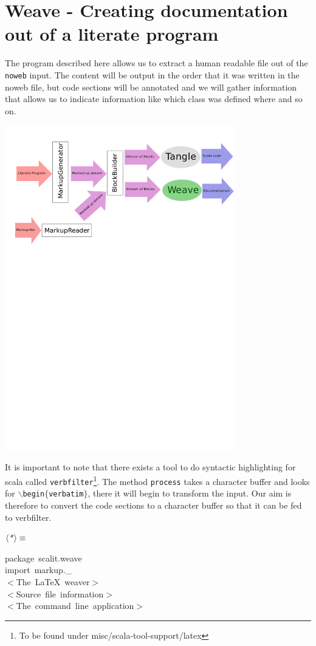 \documentclass[a4paper,12pt]{article}
\begin{document}
\section{Weave - Creating documentation out of a literate program}
The program described here allows us to extract a human readable file
out of the \texttt{noweb} input. The content will be output in the order that
it was written in the noweb file, but code sections will be annotated and
we will gather information that allows us to indicate information like
which class was defined where and so on.

\includegraphics[width=10cm,viewport=310 610 600 710,clip]{images/weave}

It is important to note that there exists a tool to do syntactic
highlighting for scala called \texttt{verbfilter}\footnote{To be found under
misc/scala-tool-support/latex}. The method \texttt{process} takes a character
buffer and looks for \texttt{$\backslash$begin$\{$verbatim$\}$}, there it will begin to transform
the input. Our aim is therefore to convert the code sections to a character
buffer so that it can be fed to verbfilter.

$\left<\mbox{\emph{*}}\right>\equiv$
\begin{program}{\vem package}~scalit.weave
\\{\vem import}~markup.\_
\\[0.5em]$<$The~LaTeX~weaver$>$
\\[0.5em]$<$Source~file~information$>$
\\[0.5em]$<$The~command~line~application$>$
\\[0.5em]\end{program}
\end{document}
